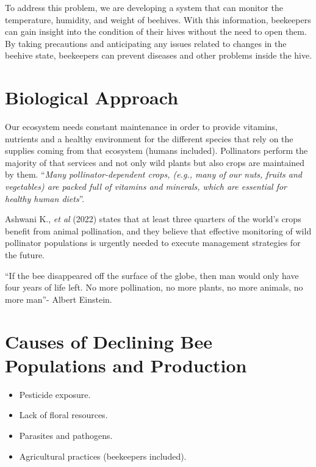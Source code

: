 \documentclass[12pt]{report}
\begin{document}
	To address this problem, we are developing a system that can monitor the temperature, humidity, and weight of beehives. With this information, beekeepers can gain insight into the condition of their hives without the need to open them. By taking precautions and anticipating any issues related to changes in the beehive state, beekeepers can prevent diseases and other problems inside the hive.
	
	\section{Biological Approach}
	
	Our ecosystem needs constant maintenance in order to provide vitamins, nutrients and a healthy environment for the different species that rely on the supplies coming from that ecosystem (humans included). Pollinators perform the majority of that services and not only wild plants but also crops are maintained by them. ``\textit{Many pollinator-dependent crops, (e.g., many of our nuts, fruits and vegetables) are packed full of vitamins and minerals, which are essential for healthy human diets}''\cite{kumar2022bees_and_pollinators}.
	
	Ashwani K., \textit{et al} (2022) states that at least three quarters of the world’s crops benefit from animal pollination, and they believe that effective monitoring of wild pollinator populations is urgently needed to execute management strategies for the future.
	
	``If the bee disappeared off the surface of the globe, then man would only have four years of life left. No more pollination, no more plants, no more animals, no more man''- Albert Einstein.
	
	\section{Causes of Declining Bee Populations and Production}
	
	\begin{itemize}
		\item Pesticide exposure.
		\item Lack of floral resources.
		\item Parasites and pathogens.
		\item Agricultural practices (beekeepers included).
	\end{itemize}
	
	
\end{document}
